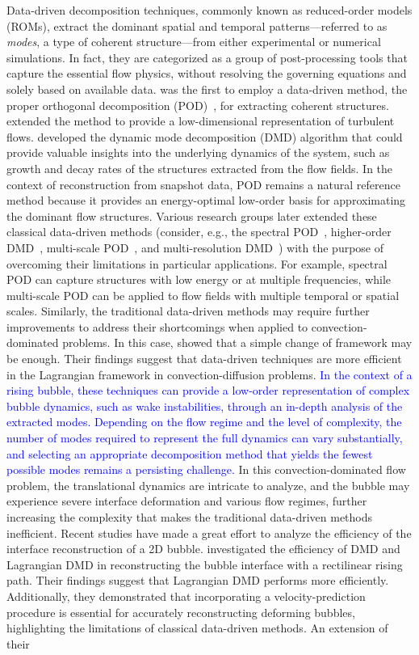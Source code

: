 \documentclass[a4paper,fleqn]{cas-sc}
\newcommand{\hl}[1]{\textcolor{blue}{#1}}
\newcommand{\hl}[1]{#1}
\begin{document}
	Data-driven decomposition techniques, commonly known as reduced-order models (ROMs), extract the dominant spatial and temporal patterns—referred to as \textit{modes}, a type of coherent structure—from either experimental or numerical simulations. In fact, they are categorized as a group of post-processing tools that capture the essential flow physics, without resolving the governing equations and solely based on available data. \citet{Lumley1967166} was the first to employ a data-driven method, the proper orthogonal decomposition (POD)~\cite{volkwein2013proper,Berkooz1993}, for extracting coherent structures. \citet{Holmes1996} extended the method to provide a low-dimensional representation of turbulent flows. \citet{SCHMID2010} developed the dynamic mode decomposition (DMD) algorithm that could provide valuable insights into the underlying dynamics of the system, such as growth and decay rates of the structures extracted from the flow fields. In the context of reconstruction from snapshot data, POD remains a natural reference method because it provides an energy-optimal low-order basis for approximating the dominant flow structures. Various research groups later extended these classical data-driven methods (consider, e.g., the spectral POD~\cite{Towne2018}, higher-order DMD~\cite{LeClainche2017}, multi-scale POD~\cite{Mendez2019}, and multi-resolution DMD~\cite{Kutzz2016a}) with the purpose of overcoming their limitations in particular applications. For example, spectral POD can capture structures with low energy or at multiple frequencies, while multi-scale POD can be applied to flow fields with multiple temporal or spatial scales. Similarly, the traditional data-driven methods may require further improvements to address their shortcomings when applied to convection-dominated problems. In this case, \citet{Lu2020} showed that a simple change of framework may be enough. Their findings suggest that data-driven techniques are more efficient in the Lagrangian framework in convection-diffusion problems. \hl{In the context of a rising bubble, these techniques can provide a low-order representation of complex bubble dynamics, such as wake instabilities, through an in-depth analysis of the extracted modes. Depending on the flow regime and the level of complexity, the number of modes required to represent the full dynamics can vary substantially, and selecting an appropriate decomposition method that yields the fewest possible modes remains a persisting challenge.} In this convection-dominated flow problem, the translational dynamics are intricate to analyze, and the bubble may experience severe interface deformation and various flow regimes, further increasing the complexity that makes the traditional data-driven methods inefficient. Recent studies have made a great effort to analyze the efficiency of the interface reconstruction of a 2D bubble. \citet{Yin2023a} investigated the efficiency of DMD and Lagrangian DMD in reconstructing the bubble interface with a rectilinear rising path. Their findings suggest that Lagrangian DMD performs more efficiently. Additionally, they demonstrated that incorporating a velocity-prediction procedure is essential for accurately reconstructing deforming bubbles, highlighting the limitations of classical data-driven methods. An extension of their 
\end{document}
